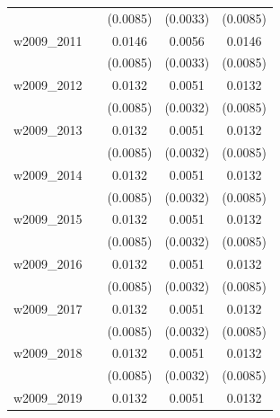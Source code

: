 \begin{table}[htbp]
\begin{tabular}{l*{4}{c}}
            &                     &    (0.0085)         &    (0.0033)         &    (0.0085)         \\
[1em]
w2009\_2011  &                     &      0.0146\sym{*}  &      0.0056\sym{*}  &      0.0146\sym{*}  \\
            &                     &    (0.0085)         &    (0.0033)         &    (0.0085)         \\
[1em]
w2009\_2012  &                     &      0.0132         &      0.0051         &      0.0132         \\
            &                     &    (0.0085)         &    (0.0032)         &    (0.0085)         \\
[1em]
w2009\_2013  &                     &      0.0132         &      0.0051         &      0.0132         \\
            &                     &    (0.0085)         &    (0.0032)         &    (0.0085)         \\
[1em]
w2009\_2014  &                     &      0.0132         &      0.0051         &      0.0132         \\
            &                     &    (0.0085)         &    (0.0032)         &    (0.0085)         \\
[1em]
w2009\_2015  &                     &      0.0132         &      0.0051         &      0.0132         \\
            &                     &    (0.0085)         &    (0.0032)         &    (0.0085)         \\
[1em]
w2009\_2016  &                     &      0.0132         &      0.0051         &      0.0132         \\
            &                     &    (0.0085)         &    (0.0032)         &    (0.0085)         \\
[1em]
w2009\_2017  &                     &      0.0132         &      0.0051         &      0.0132         \\
            &                     &    (0.0085)         &    (0.0032)         &    (0.0085)         \\
[1em]
w2009\_2018  &                     &      0.0132         &      0.0051         &      0.0132         \\
            &                     &    (0.0085)         &    (0.0032)         &    (0.0085)         \\
[1em]
w2009\_2019  &                     &      0.0132         &      0.0051         &      0.0132         \\

\end{tabular}
\end{table}
